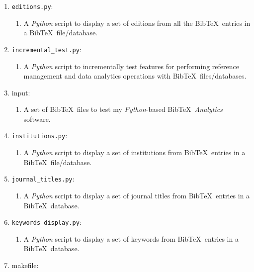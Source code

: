 \begin{enumerate}
\begin{enumerate}
	\end{enumerate}
\item {\tt editions.py}: \vspace{-0.3cm}
	\begin{enumerate} \itemsep -2pt
	\item A {\it Python} script to display a set of editions from all the {\sc Bib}\TeX\ entries in a {\sc Bib}\TeX\ file/database.
	\end{enumerate}
\item {\tt incremental\_test.py}: \vspace{-0.3cm}
	\begin{enumerate} \itemsep -2pt
	\item A {\it Python} script to incrementally test features for performing reference management and data analytics operations with {\sc Bib}\TeX\ files/databases.
	\end{enumerate}
\item input: \vspace{-0.3cm}
	\begin{enumerate} \itemsep -2pt
	\item A set of {\sc Bib}\TeX\ files to test my {\it Python}-based {\sc Bib}\TeX\ {\it Analytics} software.
	\end{enumerate}
\item {\tt institutions.py}: \vspace{-0.3cm}
	\begin{enumerate} \itemsep -2pt
	\item A {\it Python} script to display a set of institutions from {\sc Bib}\TeX\ entries in a {\sc Bib}\TeX\ file/database.
	\end{enumerate}
\item {\tt journal\_titles.py}: \vspace{-0.3cm}
	\begin{enumerate} \itemsep -2pt
	\item A {\it Python} script to display a set of journal titles from {\sc Bib}\TeX\ entries in a {\sc Bib}\TeX\ database.
	\end{enumerate}
\item {\tt keywords\_display.py}: \vspace{-0.3cm}
	\begin{enumerate} \itemsep -2pt
	\item A {\it Python} script to display a set of keywords from {\sc Bib}\TeX\ entries in a {\sc Bib}\TeX\ database.
	\end{enumerate}
\item makefile: \vspace{-0.3cm}

\end{enumerate}

